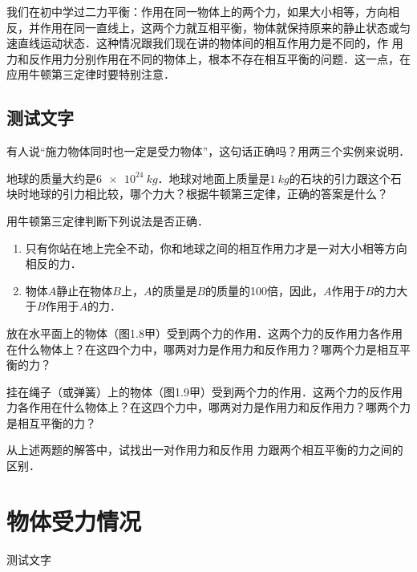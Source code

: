 我们在初中学过二力平衡：作用在同一物体上的两个力，如果大小相等，方向相反，并作用在同一直线上，这两个力就互相平衡，物体就保持原来的静止状态或匀速直线运动状态．这种情况跟我们现在讲的物体间的相互作用力是不同的，作
用力和反作用力分别作用在不同的物体上，根本不存在相互平衡的问题．这一点，在应用牛顿第三定律时要特别注意．


\subsection*{测试文字}
\zhlipsum

\begin{Exercise}
	\begin{QsNum}
	    \item  有人说“施力物体同时也一定是受力物体”，这句话正确吗？用两三个实例来说明．
	    \item  地球的质量大约是$\qty{6e24}{kg}$．地球对地面上质量是$\qty{1}{kg}$的石块的引力跟这个石块时地球的引力相比较，哪个力大？根据牛顿第三定律，正确的答案是什么？
	    \item  用牛顿第三定律判断下列说法是否正确．
	          \begin{enumerate}
	              \item  只有你站在地上完全不动，你和地球之间的相互作用力才是一对大小相等方向相反的力．
	              \item  物体$A$静止在物体$B$上，$A$的质量是$B$的质量的100倍，因此，$A$作用于$B$的力大于$B$作用于$A$的力．
	          \end{enumerate}
	    \item  放在水平面上的物体（图1.8甲）受到两个力的作用．这两个力的反作用力各作用在什么物体上？在这四个力中，哪两对力是作用力和反作用力？哪两个力是相互平衡的力？
	    \item  挂在绳子（或弹簧）上的物体（图1.9甲）受到两个力的作用．这两个力的反作用力各作用在什么物体上？在这四个力中，哪两对力是作用力和反作用力？哪两个力是相互平衡的力？
	    \item 从上述两题的解答中，试找出一对作用力和反作用
	          力跟两个相互平衡的力之间的区别．
	\end{QsNum}
\end{Exercise}




\section{物体受力情况}

\begin{Point*}
	测试文字
\end{Point*}

